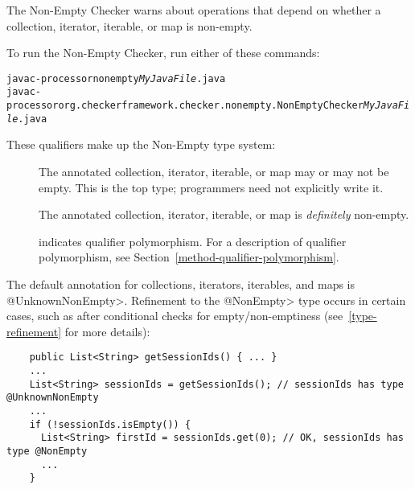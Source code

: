 \htmlhr
{}

The Non-Empty Checker warns about operations that depend on whether a
collection, iterator, iterable, or map is non-empty.

To run the Non-Empty Checker, run either of these commands:

\begin{alltt}
  javac -processor nonempty \emph{MyJavaFile}.java
  javac -processor org.checkerframework.checker.nonempty.NonEmptyChecker \emph{MyJavaFile}.java
\end{alltt}


These qualifiers make up the Non-Empty type system:

\begin{description}

\item[]
  The annotated collection, iterator, iterable, or map may or may not be empty.
  This is the top type; programmers need not explicitly write it.

\item[]
  The annotated collection, iterator, iterable, or map is \emph{definitely}
  non-empty.

\item[]
  indicates qualifier polymorphism.
  For a description of qualifier polymorphism, see
  Section~\ref{method-qualifier-polymorphism}.

\end{description}


The default annotation for collections, iterators, iterables, and maps is
\<@UnknownNonEmpty>.
Refinement to the \<@NonEmpty> type occurs in certain cases, such as after
conditional checks for empty/non-emptiness (see~\ref{type-refinement} for
more details):

\begin{Verbatim}
    public List<String> getSessionIds() { ... }
    ...
    List<String> sessionIds = getSessionIds(); // sessionIds has type @UnknownNonEmpty
    ...
    if (!sessionIds.isEmpty()) {
      List<String> firstId = sessionIds.get(0); // OK, sessionIds has type @NonEmpty
      ...
    }
\end{Verbatim}

